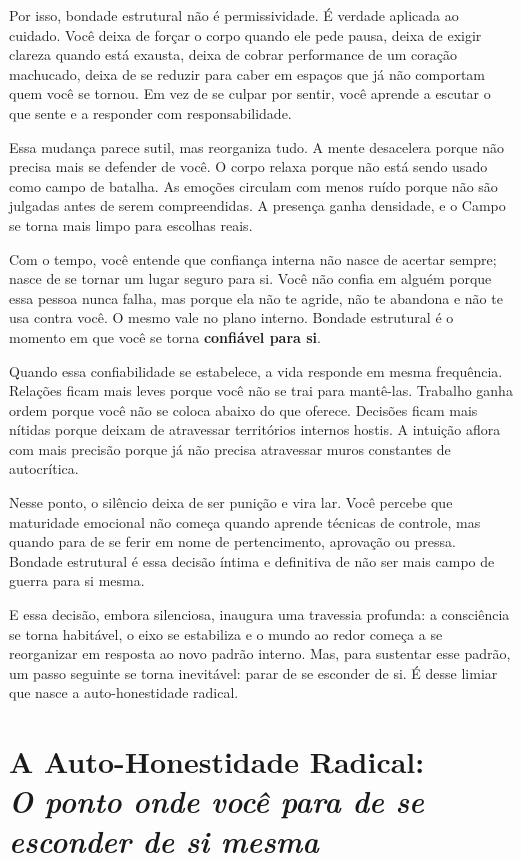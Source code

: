 \documentclass[12pt]{book}
\begin{document}
Por isso, bondade estrutural não é permissividade. É verdade aplicada ao cuidado. Você deixa de forçar o corpo quando ele pede pausa, deixa de exigir clareza quando está exausta, deixa de cobrar performance de um coração machucado, deixa de se reduzir para caber em espaços que já não comportam quem você se tornou. Em vez de se culpar por sentir, você aprende a escutar o que sente e a responder com responsabilidade.

Essa mudança parece sutil, mas reorganiza tudo. A mente desacelera porque não precisa mais se defender de você. O corpo relaxa porque não está sendo usado como campo de batalha. As emoções circulam com menos ruído porque não são julgadas antes de serem compreendidas. A presença ganha densidade, e o Campo se torna mais limpo para escolhas reais.

Com o tempo, você entende que confiança interna não nasce de acertar sempre; nasce de se tornar um lugar seguro para si. Você não confia em alguém porque essa pessoa nunca falha, mas porque ela não te agride, não te abandona e não te usa contra você. O mesmo vale no plano interno. Bondade estrutural é o momento em que você se torna \textbf{confiável para si}.

Quando essa confiabilidade se estabelece, a vida responde em mesma frequência. Relações ficam mais leves porque você não se trai para mantê-las. Trabalho ganha ordem porque você não se coloca abaixo do que oferece. Decisões ficam mais nítidas porque deixam de atravessar territórios internos hostis. A intuição aflora com mais precisão porque já não precisa atravessar muros constantes de autocrítica.

Nesse ponto, o silêncio deixa de ser punição e vira lar. Você percebe que maturidade emocional não começa quando aprende técnicas de controle, mas quando para de se ferir em nome de pertencimento, aprovação ou pressa. Bondade estrutural é essa decisão íntima e definitiva de não ser mais campo de guerra para si mesma.

E essa decisão, embora silenciosa, inaugura uma travessia profunda: a consciência se torna habitável, o eixo se estabiliza e o mundo ao redor começa a se reorganizar em resposta ao novo padrão interno. Mas, para sustentar esse padrão, um passo seguinte se torna inevitável: parar de se esconder de si. É desse limiar que nasce a auto-honestidade radical.

\chapter[A Auto-Honestidade Radical: O ponto onde você para de se esconder de si mesma]{A Auto-Honestidade Radical:\\[0.4ex]\large\itshape O ponto onde você para de se esconder de si mesma}
\end{document}
